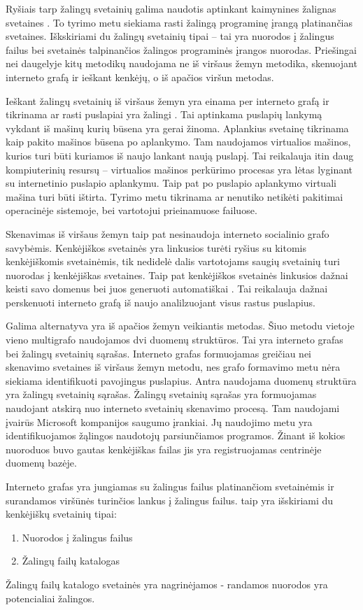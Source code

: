
Ryšiais tarp žalingų svetainių galima naudotis aptinkant kaimynines žalignas svetaines \cite{webcop}.
To tyrimo metu siekiama rasti žalingą programinę įrangą platinančias svetaines. Iškskiriami du žalingų svetainių tipai --
tai yra nuorodos į žalingus failus bei svetainės talpinančios žalingos programinės įrangos nuorodas.
Priešingai nei daugelyje kitų metodikų naudojama ne iš viršaus žemyn metodika, skenuojant interneto grafą ir ieškant kenkėjų,
o iš apačios viršun metodas.

Ieškant žalingų svetainių iš viršaus žemyn yra einama per interneto grafą ir tikrinama ar rasti puslapiai yra žalingi \cite{webcop}.
Tai aptinkama puslapių lankymą vykdant iš mašinų kurių būsena yra gerai žinoma. Aplankius svetainę tikrinama kaip pakito
mašinos būsena po aplankymo. Tam naudojamos virtualios mašinos, kurios turi būti kuriamos iš naujo lankant naują puslapį.
Tai reikalauja itin daug kompiuterinių resursų -- virtualios mašinos perkūrimo procesas yra lėtas lyginant su
internetinio puslapio aplankymu. Taip pat po puslapio aplankymo virtuali mašina turi būti ištirta. Tyrimo metu tikrinama
ar nenutiko netikėti pakitimai operacinėje sistemoje, bei vartotojui prieinamuose failuose.

Skenavimas iš viršaus žemyn taip pat nesinaudoja interneto socialinio grafo savybėmis. Kenkėjiškos svetainės yra linkusios
turėti ryšius su kitomis kenkėjiškomis svetainėmis, tik nedidelė dalis vartotojams saugių svetainių turi nuorodas į
kenkėjiškas svetaines. Taip pat kenkėjiškos svetainės linkusios dažnai keisti savo domenus \cite{webcop} bei juos
generuoti automatiškai \cite{trees}. Tai reikalauja dažnai perskenuoti interneto grafą iš naujo analilzuojant visus
rastus puslapius.

Galima alternatyva yra iš apačios žemyn veikiantis metodas. Šiuo metodu vietoje vieno multigrafo naudojamos dvi duomenų
struktūros. Tai yra interneto grafas bei žalingų svetainių sąrašas. Interneto grafas formuojamas greičiau nei skenavimo
svetaines iš viršaus žemyn metodu, nes grafo formavimo metu nėra siekiama identifikuoti pavojingus puslapius. Antra naudojama
duomenų struktūra yra žalingų svetainių sąrašas. Žalingų svetainių sąrašas yra formuojamas naudojant atskirą nuo
interneto svetainių skenavimo procesą. Tam naudojami įvairūs Microsoft kompanijos saugumo įrankiai. Jų naudojimo metu
yra identifikuojamos žąlingos naudotojų parsiunčiamos programos. Žinant iš kokios nuoroduos buvo gautas kenkėjiškas failas
jis yra registruojamas centrinėje duomenų bazėje.

Interneto grafas yra jungiamas su žalingus failus platinančiom svetainėmis ir surandamos viršūnės turinčios lankus į žalingus failus.
taip yra išskiriami du kenkėjiškų svetainių tipai:
\begin{enumerate}[label=\alph*]
    \item Nuorodos į žalingus failus
    \item Žalingų failų katalogas
\end{enumerate}
Žalingų failų katalogo svetainės yra nagrinėjamos - randamos nuorodos yra potencialiai žalingos.



\newpage